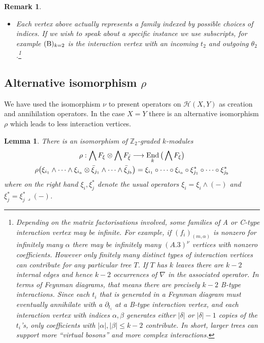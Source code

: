 \documentclass[english,letter paper,12pt,leqno]{article}
\newtheorem{lemma}[theorem]{Lemma}
\theoremstyle{example}
\newtheorem{remark}[theorem]{Remark}
\numberwithin{equation}{section}
\def\HH{\HH}
\def\HH{\mathcal{H}}
\def\nZ{\mathds{Z}}
\DeclareMathOperator{\End}{End}
\begin{document}
\begin{remark}
\begin{itemize}
\item Each vertex above actually represents a family indexed by possible choices of indices. If we wish to speak about a specific instance we use subscripts, for example $(\textup{B})_{k=2}$ is the interaction vertex with an incoming $t_2$ and outgoing $\theta_2$.\footnote{Depending on the matrix factorisations involved, some families of A or C-type interaction vertex may be \emph{infinite}. For example, if $(f_i)_{(m, \alpha)}$ is nonzero for infinitely many $\alpha$ there may be infinitely many $(A.3)^{\nu}$ vertices with nonzero coefficients. However only finitely many distinct types of interaction vertices can contribute for any particular tree $T$. If $T$ has $k$ leaves there are $k - 2$ internal edges and hence $k - 2$ occurrences of $\nabla$ in the associated operator. In terms of Feynman diagrams, that means there are precisely $k - 2$ B-type interactions. Since each $t_i$ that is generated in a Feynman diagram must eventually annihilate with a $\partial_{t_i}$ at a B-type interaction vertex, and each interaction vertex with indices $\alpha, \beta$ generates either $|\delta|$ or $|\delta| - 1$ copies of the $t_i$'s, only coefficients with $|\alpha|, |\beta| \le k - 2$ contribute. In short, larger trees can support more ``virtual bosons'' and more complex interactions.}
\end{itemize}
\end{remark}

\subsection{Alternative isomorphism $\rho$}\label{section:altrho}

We have used the isomorphism $\nu$ to present operators on $\HH(X,Y)$ as creation and annihilation operators. In the case $X = Y$ there is an alternative isomorphism $\rho$ which leads to less interaction vertices.

\begin{lemma}\label{lemma:iso_rho} There is an isomorphism of $\nZ_2$-graded $k$-modules
\begin{gather*}
\rho: \bigwedge F_\xi \otimes \bigwedge F_{\Bar{\xi}} \lto \End_k\big( \bigwedge F_\xi \big)\\
\rho\big( \xi_{i_1} \wedge \cdots \wedge \xi_{i_a} \otimes \Bar{\xi}_{j_1} \wedge \cdots \wedge \Bar{\xi}_{j_b} \big) = \xi_{i_1} \circ \cdots \circ \xi_{i_a} \circ \xi_{j_1}^* \circ \cdots \circ \xi_{j_b}^*
\end{gather*}
where on the right hand $\xi_i, \xi_j^*$ denote the usual operators $\xi_i = \xi_i \wedge (-)$ and $\xi_j^* = \xi_j^* \lrcorner (-)$.
\end{lemma}
\end{document}
